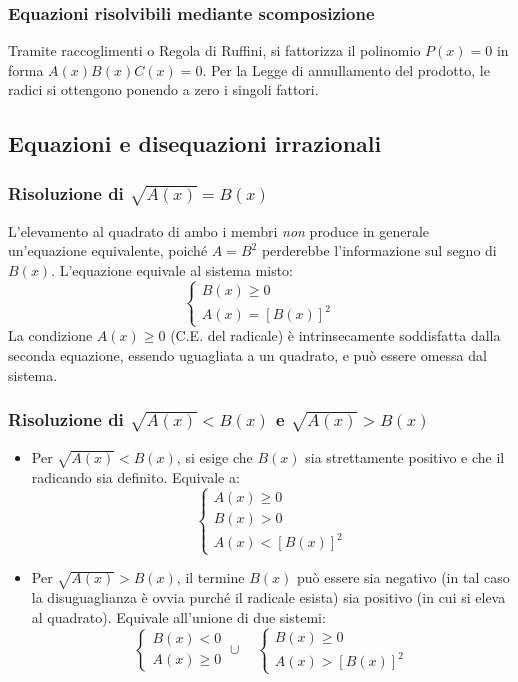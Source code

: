 \subsubsection{Equazioni risolvibili mediante scomposizione}
Tramite raccoglimenti o Regola di Ruffini, si fattorizza il polinomio $P(x)=0$ in forma $A(x)B(x)C(x)=0$. Per la Legge di annullamento del prodotto, le radici si ottengono ponendo a zero i singoli fattori.

\subsection{Equazioni e disequazioni irrazionali}
\subsubsection{Risoluzione di $\sqrt{A(x)} = B(x)$}
L'elevamento al quadrato di ambo i membri \textit{non} produce in generale un'equazione equivalente, poiché $A=B^2$ perderebbe l'informazione sul segno di $B(x)$. L'equazione equivale al sistema misto:
\[
\begin{cases} B(x) \ge 0 \\ A(x) = [B(x)]^2 \end{cases}
\]
La condizione $A(x) \ge 0$ (C.E. del radicale) è intrinsecamente soddisfatta dalla seconda equazione, essendo uguagliata a un quadrato, e può essere omessa dal sistema.

\subsubsection{Risoluzione di $\sqrt{A(x)} < B(x)$ e $\sqrt{A(x)} > B(x)$}
\begin{itemize}
    \item Per $\sqrt{A(x)} < B(x)$, si esige che $B(x)$ sia strettamente positivo e che il radicando sia definito. Equivale a:
    \[ \begin{cases} A(x) \ge 0 \\ B(x) > 0 \\ A(x) < [B(x)]^2 \end{cases} \]
    
    \item Per $\sqrt{A(x)} > B(x)$, il termine $B(x)$ può essere sia negativo (in tal caso la disuguaglianza è ovvia purché il radicale esista) sia positivo (in cui si eleva al quadrato). Equivale all'unione di due sistemi:
    \[ \begin{cases} B(x) < 0 \\ A(x) \ge 0 \end{cases} \cup \quad \begin{cases} B(x) \ge 0 \\ A(x) > [B(x)]^2 \end{cases} \]
\end{itemize}

